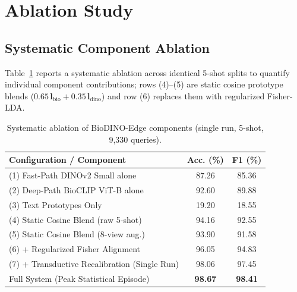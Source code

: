 \section{Ablation Study}
\label{sec:ablation_study}

\subsection{Systematic Component Ablation}
\label{sec:ablation}
Table~\ref{tab:ablation} reports a systematic ablation across identical 5-shot splits to quantify individual component contributions; rows (4)--(5) are static cosine prototype blends ($0.65\,\mathbf{l}_{\text{bio}}+0.35\,\mathbf{l}_{\text{dino}}$) and row (6) replaces them with regularized Fisher-LDA.

\begin{table}[htbp]
\caption{Systematic ablation of BioDINO-Edge components (single run, 5-shot, 9,330 queries).}
\label{tab:ablation}
\centering

\footnotesize
\setlength{\tabcolsep}{3pt}
\begin{tabular*}{\columnwidth}{@{\extracolsep{\fill}}lcc}
\toprule
\textbf{Configuration / Component} & \textbf{Acc. (\%)} & \textbf{F1 (\%)} \\
\midrule
(1) Fast-Path DINOv2 Small alone & 87.26 & 85.36 \\
(2) Deep-Path BioCLIP ViT-B alone & 92.60 & 89.88 \\
(3) Text Prototypes Only & 19.20 & 18.55 \\
(4) Static Cosine Blend (raw 5-shot) & 94.16 & 92.55 \\
(5) Static Cosine Blend (8-view aug.) & 93.90 & 91.58 \\
(6) + Regularized Fisher Alignment & 96.05 & 94.83 \\
(7) + Transductive Recalibration (Single Run) & 98.06 & 97.45 \\
\midrule
Full System (Peak Statistical Episode) & \textbf{98.67} & \textbf{98.41} \\
\bottomrule
\end{tabular*}
\end{table}

